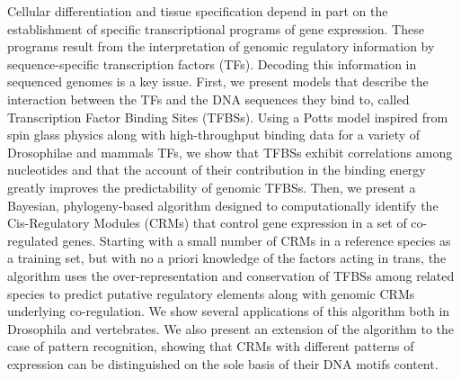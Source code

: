 \begin{ThesisAbstract}

	\begin{FrenchAbstract}
	
	
	\end{FrenchAbstract}
	
   \begin{EnglishAbstract}

      Cellular differentiation and tissue specification depend in part on the
      establishment of specific transcriptional programs of gene expression.
      These programs result from the interpretation of genomic regulatory
      information by sequence-specific transcription factors (TFs). Decoding
      this information in sequenced genomes is a key issue.
      First, we present models that describe the interaction between the TFs
      and the DNA sequences they bind to, called Transcription Factor Binding
      Sites (TFBSs). Using a Potts model inspired from spin glass physics along
      with high-throughput binding data for a variety of Drosophilae and
      mammals TFs, we show that TFBSs exhibit correlations among nucleotides
      and that the account of their contribution in the binding energy greatly
      improves the predictability of genomic TFBSs.
      Then, we present a Bayesian, phylogeny-based algorithm designed to
      computationally identify the Cis-Regulatory Modules (CRMs) that control
      gene expression in a set of co-regulated genes. Starting with a small
      number of CRMs in a reference species as a training set, but with no a
      priori knowledge of the factors acting in trans, the algorithm uses the
      over-representation and conservation of TFBSs among related species to
      predict putative regulatory elements along with genomic CRMs underlying
      co-regulation. We show several applications of this algorithm both in
      Drosophila and vertebrates. We also present an extension of the algorithm
      to the case of pattern recognition, showing that CRMs with different
      patterns of expression can be distinguished on the sole basis of their
      DNA motifs content.
	
      \end{EnglishAbstract}
	
\end{ThesisAbstract}
